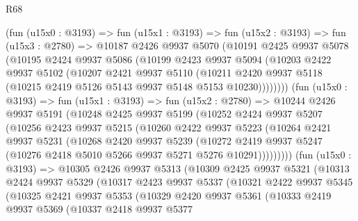 \begin{lexlean}{R68}
\begin{coremodule}
        (fun (u15x0 : @3193) =>
        fun (u15x1 : @3193) =>
        fun (u15x2 : @3193) =>
        fun (u15x3 : @2780) =>
        @10187
          @2426
          @9937
          @5070
          (@10191
            @2425
            @9937
            @5078
            (@10195
              @2424
              @9937
              @5086
              (@10199
                @2423
                @9937
                @5094
                (@10203
                  @2422
                  @9937
                  @5102
                  (@10207
                    @2421
                    @9937
                    @5110
                    (@10211
                      @2420
                      @9937
                      @5118
                      (@10215 @2419 @5126 @5143 @9937 @5148 @5153 @10230))))))))
        (fun (u15x0 : @3193) =>
        fun (u15x1 : @3193) =>
        fun (u15x2 : @2780) =>
        @10244
          @2426
          @9937
          @5191
          (@10248
            @2425
            @9937
            @5199
            (@10252
              @2424
              @9937
              @5207
              (@10256
                @2423
                @9937
                @5215
                (@10260
                  @2422
                  @9937
                  @5223
                  (@10264
                    @2421
                    @9937
                    @5231
                    (@10268
                      @2420
                      @9937
                      @5239
                      (@10272
                        @2419
                        @9937
                        @5247
                        (@10276 @2418 @5010 @5266 @9937 @5271 @5276 @10291)))))))))
        (fun (u15x0 : @3193) =>
        @10305
          @2426
          @9937
          @5313
          (@10309
            @2425
            @9937
            @5321
            (@10313
              @2424
              @9937
              @5329
              (@10317
                @2423
                @9937
                @5337
                (@10321
                  @2422
                  @9937
                  @5345
                  (@10325
                    @2421
                    @9937
                    @5353
                    (@10329
                      @2420
                      @9937
                      @5361
                      (@10333
                        @2419
                        @9937
                        @5369
                        (@10337
                          @2418
                          @9937
                          @5377

\end{coremodule}
\end{lexlean}

